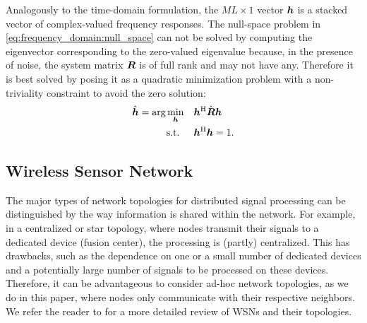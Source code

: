 \documentclass{article}
\begin{document}
Analogously to the time-domain formulation, the \(ML \times 1\) vector \({\bm{h}}\) is a stacked vector of complex-valued frequency responses.
The null-space problem in \eqref{eq:frequency_domain:null_space} can not be solved by computing the eigenvector corresponding to the zero-valued eigenvalue because, in the presence of noise, the system matrix \({\bm{{R}}}\) is of full rank and may not have any.
Therefore it is best solved by posing it as a quadratic minimization problem \cite{guanghanxuLeastsquaresApproachBlind1995,huangAdaptiveMultichannelLeast2002} with a non-triviality constraint to avoid the zero solution:
\begin{equation}
    \begin{aligned}
        \hat{{\bm{h}}} = \arg \min_{{\bm{h}}} \quad &{\bm{h}}^{\mathrm{H}} \hat{{\bm{{R}}}} {\bm{h}} \\
        \text{s.t. } \quad &{\bm{h}}^{\mathrm{H}} {\bm{h}} = 1.
    \end{aligned}\label{eq:frequency_domain:min_prob}
\end{equation}

\subsection{Wireless Sensor Network}
\label{ssec:sensor_network}

The major types of network topologies for distributed signal processing can be distinguished by the way information is shared within the network.
For example, in a centralized or star topology, where nodes transmit their signals to a dedicated device (fusion center), the processing is (partly) centralized.
This has drawbacks, such as the dependence on one or a small number of dedicated devices and a potentially large number of signals to be processed on these devices.
Therefore, it can be advantageous to consider ad-hoc network topologies, as we do in this paper, where nodes only communicate with their respective neighbors.
We refer the reader to \cite{bertrandApplicationsTrendsWireless2011b} for a more detailed review of WSNs and their topologies.
\end{document}
